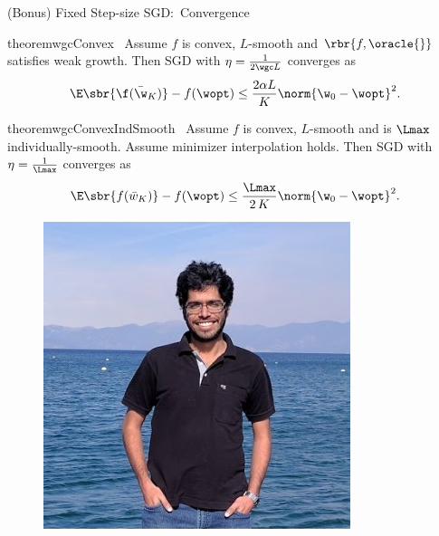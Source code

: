 \documentclass[mathserif,notheorems, hyperref={colorlinks, citecolor=blue, urlcolor=blue, linkcolor=blue}]{beamer}
\begin{document}
    \begin{frame}{(Bonus) Fixed Step-size SGD:\ Convergence}
        \vspace{-2ex}
        \begin{minipage}[t]{0.82\textwidth}
        \vspace{-1.45ex} 
        \begin{restatable}{theorem}{wgcConvex}~\label{thm:wgc-convex}
            Assume \( f \) is convex, \( L \)-smooth and \( \rbr{f, \oracle{}} \) satisfies weak growth. 
            Then SGD with \( \eta = \frac{1}{2 \wgc L} \) converges as
            \[ \E\sbr{\f(\bar \w_K)} - f(\wopt) \leq \frac{2 \alpha L}{K} \norm{\w_0 - \wopt}^2. \]
        \end{restatable}

        \begin{restatable}{theorem}{wgcConvexIndSmooth}~\label{thm:wgc-convex-ind-smooth}
            Assume \( f \) is convex, \( L \)-smooth and \oracle{} is \( \Lmax \) individually-smooth. 
            Assume minimizer interpolation holds. 
            Then SGD with \( \eta = \frac{1}{\Lmax} \) converges as
            \[ \E\sbr{f(\bar w_K)} - f(\wopt) \leq \frac{\Lmax}{2 \, K} \norm{\w_0 - \wopt}^2.   \]
        \end{restatable}

        \end{minipage} 
        \begin{minipage}[t]{0.15\textwidth}
            \begin{figure}[t]
                \centering
                \includegraphics[width=0.8\textwidth]{collaborators/sharan}


\end{figure}
\end{minipage}
\end{frame}
\end{document}
